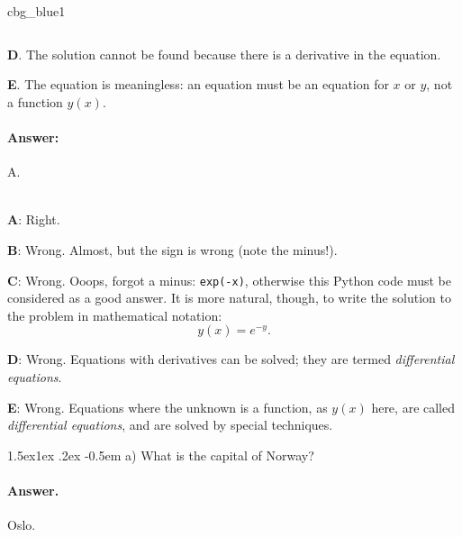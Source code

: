 \documentclass[%
oneside,                 %
final,                   %
10pt]{article}
\makeatletter
\newenvironment{_cod_tight}[1]{
   \def\FrameCommand{\colorbox{#1}}
   \FrameRule0.6pt\MakeFramed {\FrameRestore}\vskip3mm}
   {\vskip0mm\endMakeFramed}
\newenvironment{cod}[1]{
\bgroup\rmfamily
\fboxsep=0mm\relax
\begin{_cod_tight}{#1}
\list{}{\parsep=-2mm\parskip=0mm\topsep=0pt\leftmargin=2mm
\rightmargin=2\leftmargin\leftmargin=4pt\relax}
\item\relax}
{\endlist\end{_cod_tight}\egroup}
\newenvironment{doconcequiz}{}{}
\newenvironment{doconceexercise}{}{}
\newcounter{doconceexercisecounter}
\newcommand\subex{\@startsection{paragraph}{4}{\z@}%
                  {1.5ex\@plus1ex \@minus.2ex}%
                  {-0.5em}%
                  {\normalfont\normalsize\bfseries}}
\theoremstyle{definition}
\makeatother
\begin{document}
\begin{enumerate}
\begin{doconceexercise}
\begin{doconcequiz}
\begin{cod}{cbg_blue1}
\begin{lstlisting}[language=Python,style=myspeciallststyle,numbers=left,numberstyle=\tiny,stepnumber=3,numbersep=15pt,xleftmargin=1mm]
\end{lstlisting}\end{cod}
\noindent

\textbf{D}. 
The solution cannot be found because there is a derivative in the equation.

\textbf{E}. 
The equation is meaningless: an equation must be an equation
for $x$ or $y$, not a function $y(x)$.


\paragraph{Answer:} A.

\\


\textbf{A}: Right. 

\textbf{B}: Wrong. Almost, but the sign is wrong (note the minus!).

\textbf{C}: Wrong. Ooops, forgot a minus: \texttt{exp(-x)}, otherwise this Python code
must be considered as a good answer. It is more natural,
though, to write the solution to the problem
in mathematical notation:
\[ y(x) = e^{-y}.\]

\textbf{D}: Wrong. Equations with derivatives can be solved;
they are termed \emph{differential
equations}.

\textbf{E}: Wrong. Equations where the unknown is a function, as $y(x)$
here, are called \emph{differential equations}, and are solved by
special techniques.




\vspace{3mm}

\end{doconcequiz}


\end{doconceexercise}
\begin{doconceexercise}
                             
\subex{a)}
What is the capital of Norway?
\paragraph{Answer.}
Oslo.
\end{doconceexercise}

\end{enumerate}
\end{document}
